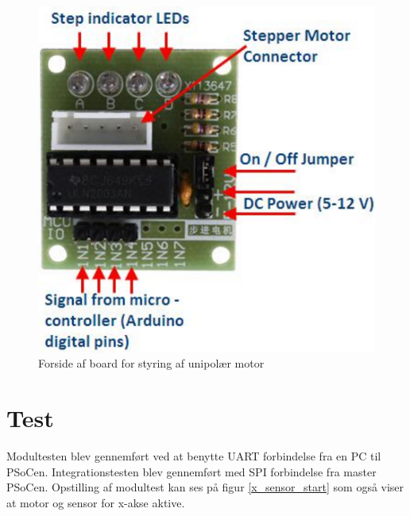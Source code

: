 \begin{figure}[H]
\includegraphics[scale=0.75]{Screenshots/ULN2003AN_board.png}
\caption{Forside af board for styring af unipolær motor}
\label{print_forside}
\end{figure}

\section{Test}
Modultesten blev gennemført ved at benytte UART forbindelse fra en PC til PSoCen. Integrationstesten blev gennemført med SPI forbindelse fra master PSoCen. Opstilling af modultest kan ses på figur \ref{x_sensor_start} som også viser at motor og sensor for x-akse aktive.

